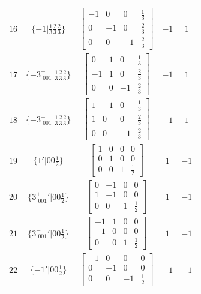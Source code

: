 \documentclass[fleqn,8pt]{jsarticle}
\begin{document}
\begin{longtable}{ccccc}
$ 16 $ & $ \{-1|\frac{1}{3} \frac{2}{3} \frac{2}{3}\} $ & $ \begin{bmatrix} -1 & 0 & 0 & \frac{1}{3} \\ 0 & -1 & 0 & \frac{2}{3} \\ 0 & 0 & -1 & \frac{2}{3} \end{bmatrix} $ & $ -1 $ & $ 1 $ \\ \hline
$ 17 $ & $ \{-3^{+}_{\,\,001}|\frac{1}{3} \frac{2}{3} \frac{2}{3}\} $ & $ \begin{bmatrix} 0 & 1 & 0 & \frac{1}{3} \\ -1 & 1 & 0 & \frac{2}{3} \\ 0 & 0 & -1 & \frac{2}{3} \end{bmatrix} $ & $ -1 $ & $ 1 $ \\ \hline
$ 18 $ & $ \{-3^{-}_{\,\,001}|\frac{1}{3} \frac{2}{3} \frac{2}{3}\} $ & $ \begin{bmatrix} 1 & -1 & 0 & \frac{1}{3} \\ 1 & 0 & 0 & \frac{2}{3} \\ 0 & 0 & -1 & \frac{2}{3} \end{bmatrix} $ & $ -1 $ & $ 1 $ \\ \hline
$ 19 $ & $ \{1{}'|0 0 \frac{1}{2}\} $ & $ \begin{bmatrix} 1 & 0 & 0 & 0 \\ 0 & 1 & 0 & 0 \\ 0 & 0 & 1 & \frac{1}{2} \end{bmatrix} $ & $ 1 $ & $ -1 $ \\ \hline
$ 20 $ & $ \{3^{+}_{\,\,001}{}'|0 0 \frac{1}{2}\} $ & $ \begin{bmatrix} 0 & -1 & 0 & 0 \\ 1 & -1 & 0 & 0 \\ 0 & 0 & 1 & \frac{1}{2} \end{bmatrix} $ & $ 1 $ & $ -1 $ \\ \hline
$ 21 $ & $ \{3^{-}_{\,\,001}{}'|0 0 \frac{1}{2}\} $ & $ \begin{bmatrix} -1 & 1 & 0 & 0 \\ -1 & 0 & 0 & 0 \\ 0 & 0 & 1 & \frac{1}{2} \end{bmatrix} $ & $ 1 $ & $ -1 $ \\ \hline
$ 22 $ & $ \{-1{}'|0 0 \frac{1}{2}\} $ & $ \begin{bmatrix} -1 & 0 & 0 & 0 \\ 0 & -1 & 0 & 0 \\ 0 & 0 & -1 & \frac{1}{2} \end{bmatrix} $ & $ -1 $ & $ -1 $ \\ \hline

\end{longtable}
\end{document}
